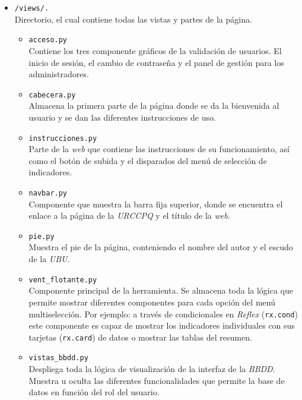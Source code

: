 \begin{itemize}
\begin{itemize}
				
			\item \texttt{/views/.}\\Directorio, el cual contiene todas las vistas y partes de la página.
				\begin{itemize}
					\item \texttt{acceso.py}\\Contiene los tres componente gráficos de la validación de usuarios. El inicio de sesión, el cambio de contraseña y el panel de gestión para los administradores.
					\item \texttt{cabecera.py}\\Almacena la primera parte de la página donde se da la bienvenida al usuario y se dan las diferentes instrucciones de uso.
					\item \texttt{instrucciones.py}\\Parte de la \textit{web} que contiene las instrucciones de su funcionamiento, así como el botón de subida y el disparados del menú de selección de indicadores.
					\item \texttt{navbar.py}\\Componente que muestra la barra fija superior, donde se encuentra el enlace a la página de la \textit{URCCPQ} y el título de la \textit{web}.
					\item \texttt{pie.py}\\Muestra el pie de la página, conteniendo el nombre del autor y el escudo de la \textit{UBU}.
					
					\item \texttt{vent\_flotante.py}\\Componente principal de la herramienta. Se almacena toda la lógica que permite mostrar diferentes componentes para cada opción del menú multiselección. Por ejemplo: a través de condicionales en \textit{Reflex} (\texttt{rx.cond}) este componente es capaz de mostrar los indicadores individuales con sus tarjetas (\texttt{rx.card}) de datos o mostrar las tablas del resumen.
					
					\item \texttt{vistas\_bbdd.py}\\Despliega toda la lógica de visualización de la interfaz de la \textit{BBDD}. Muestra u oculta las diferentes funcionalidades que permite la base de datos en función del rol del usuario.
				\end{itemize}
		\end{itemize}	
	

\end{itemize}
